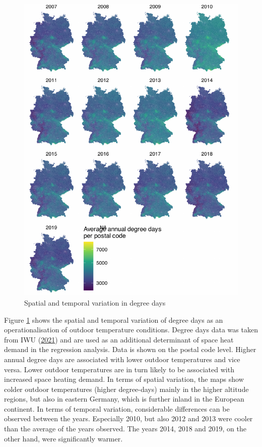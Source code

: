 \documentclass[12pt,twoside]{reedthesis}
\begin{document}
\singlespacing
\newpage
\begin{figure}

{\centering \includegraphics[width=0.72\linewidth]{figure/distribution_degree_days} 

}

\caption{Spatial and temporal variation in degree days}\label{fig:degree-days-distribution}
\end{figure}
\noindent
Figure \ref{fig:degree-days-distribution} shows the spatial and temporal variation of degree days as an operationalisation of outdoor temperature conditions. Degree days data was taken from IWU (\protect\hyperlink{ref-iwu21}{2021}) and are used as an additional determinant of space heat demand in the regression analysis. Data is shown on the postal code level. Higher annual degree days are associated with lower outdoor temperatures and vice versa. Lower outdoor temperatures are in turn likely to be associated with increased space heating demand. In terms of spatial variation, the maps show colder outdoor temperatures (higher degree-days) mainly in the higher altitude regions, but also in eastern Germany, which is further inland in the European continent. In terms of temporal variation, considerable differences can be observed between the years. Especially 2010, but also 2012 and 2013 were cooler than the average of the years observed. The years 2014, 2018 and 2019, on the other hand, were significantly warmer.
\end{document}
